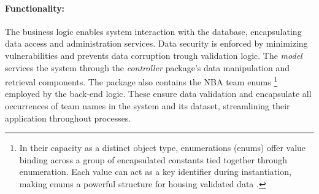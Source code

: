 \documentclass{thesis-ekf}
\theoremstyle{definition}
\theoremstyle{remark}
\begin{document}
\paragraph{Functionality:}
The business logic enables system interaction with the database, encapsulating data access and administration services. Data security is enforced by minimizing vulnerabilities and prevents data corruption trough validation logic. The \emph{model} services the system through the \emph{controller} package's data manipulation and retrieval components.
The package also contains the NBA team enums \footnote{In their capacity as a distinct object type, enumerations (enums) offer value binding across a group of encapsulated constants tied together through enumeration. Each value can act as a key identifier during instantiation, making enums a powerful structure for housing validated data \cite{enum}.} employed by the back-end logic. These ensure data validation and encapsulate all occurrences of team names in the system and its dataset, streamlining their application throughout processes.
\end{document}
